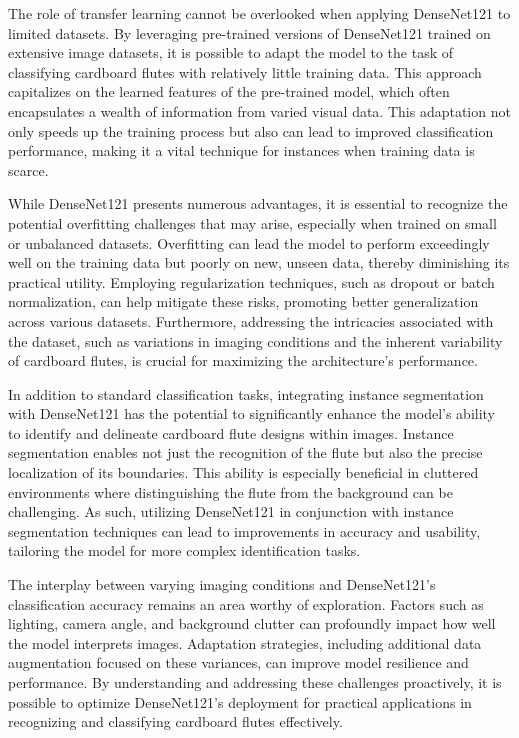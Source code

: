 The role of transfer learning cannot be overlooked when applying DenseNet121 to limited datasets. By leveraging pre-trained versions of DenseNet121 trained on extensive image datasets, it is possible to adapt the model to the task of classifying cardboard flutes with relatively little training data. This approach capitalizes on the learned features of the pre-trained model, which often encapsulates a wealth of information from varied visual data. This adaptation not only speeds up the training process but also can lead to improved classification performance, making it a vital technique for instances when training data is scarce.


While DenseNet121 presents numerous advantages, it is essential to recognize the potential overfitting challenges that may arise, especially when trained on small or unbalanced datasets. Overfitting can lead the model to perform exceedingly well on the training data but poorly on new, unseen data, thereby diminishing its practical utility. Employing regularization techniques, such as dropout or batch normalization, can help mitigate these risks, promoting better generalization across various datasets. Furthermore, addressing the intricacies associated with the dataset, such as variations in imaging conditions and the inherent variability of cardboard flutes, is crucial for maximizing the architecture's performance.


In addition to standard classification tasks, integrating instance segmentation with DenseNet121 has the potential to significantly enhance the model's ability to identify and delineate cardboard flute designs within images. Instance segmentation enables not just the recognition of the flute but also the precise localization of its boundaries. This ability is especially beneficial in cluttered environments where distinguishing the flute from the background can be challenging. As such, utilizing DenseNet121 in conjunction with instance segmentation techniques can lead to improvements in accuracy and usability, tailoring the model for more complex identification tasks.


The interplay between varying imaging conditions and DenseNet121's classification accuracy remains an area worthy of exploration. Factors such as lighting, camera angle, and background clutter can profoundly impact how well the model interprets images. Adaptation strategies, including additional data augmentation focused on these variances, can improve model resilience and performance. By understanding and addressing these challenges proactively, it is possible to optimize DenseNet121's deployment for practical applications in recognizing and classifying cardboard flutes effectively.


